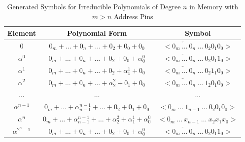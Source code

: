     \begin{table}[h]
        \def\arraystretch{2.5}
        \caption{Generated Symbols for Irreducible Polynomials of Degree $n$ in Memory with $m > n$ Address Pins}
        \centering
        \begin{tabular*}{400pt}{@{\extracolsep{\fill}} ccc}

        \textbf{Element} & \textbf{Polynomial Form} & \textbf{Symbol}
        \\
        \hline $0$ & $0_{m} + \ldots + 0_{n} + \ldots + 0_{2} +
        0_{0} + 0_{0}$ & $< \overleftarrow{0_{m} \ \ldots \
        0_{n}} \ \ldots \ 0_{2} 0_{1} 0_{0} >$ \\


        $\alpha^{0}$ & $0_{m} + \ldots + 0_{n} + \ldots + 0_{2} +
        0_{0} + \alpha^{0}_{0}$ & $< \overleftarrow{0_{m} \ \ldots \
        0_{n}} \ \ldots \ 0_{2} 0_{1} 1_{0} >$ \\

        $\alpha^{1}$ & $0_{m} + \ldots + 0_{n} + \ldots + 0_{2} +
        \alpha^{1}_{1} + 0_{0}$ & $< \overleftarrow{0_{m} \ \ldots \
        0_{n}} \ \ldots \ 0_{2} 1_{1} 0_{0} >$ \\

        $\alpha^{2}$ & $0_{m} + \ldots + 0_{n} + \ldots +
        \alpha^{2}_{2} + 0_{1} + 0_{0}$ & $< \overleftarrow{0_{m} \ \ldots \
        0_{n}} \ \ldots \ 1_{2} 0_{1} 0_{0} >$ \\

        $\ldots$ & $\ldots$ & $\ldots$ \\

        $\alpha^{n-1}$ & $0_{m} + \ldots + \alpha^{n-1}_{n-1} + \ldots
        + 0_{2} + 0_{1} + 0_{0}$ & $< 0_{m} \ \ldots \ 1_{n-1} \ \ldots \
          0_{2} 0_{1} 0_{0} >$ \\

        $\alpha^{n}$ & $0_{m} + \ldots + \alpha^{n-1}_{n-1} + \ldots
        +\alpha^{2}_{2} + \alpha^{1}_{1} + \alpha^{0}_{0}$ & $< 0_{m} \ 
        \ldots \ x_{n-1} \ \ldots \ x_{2} x_{1} x_{0} >$ \\

        $\alpha^{2^n-1}$ & $0_{m} + \ldots + 0_{n} + \ldots + 0_{2} +
        0_{0} + \alpha^{0}_{0}$ & $< \overleftarrow{0_{m} \ \ldots \
        0_{n}} \ \ldots \ 0_{2} 0_{1} 1_{0} >$ \\

        \end{tabular*}
        \label{table:default_sym}
    \end{table}

